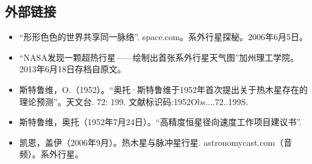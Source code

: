 \subsection{外部链接}
\begin{itemize}
\item “形形色色的世界共享同一脉络”. space.com。系外行星探秘。2006年6月5日。
\item “NASA发现一颗超热行星——绘制出首张系外行星天气图”加州理工学院。2013年6月18日存档自原文。
\item 斯特鲁维，O.（1952）。“奥托·斯特鲁维于1952年首次提出关于热木星存在的理论预测”。天文台. 72: 199. 文献标识码:1952Obs....72..199S.
\item 斯特鲁维，奥托（1952年7月24日）。“高精度恒星径向速度工作项目建议书”.
\item 凯恩，盖伊（2006年9月）。热木星与脉冲星行星. astronomycast.com（音频）。系外行星。
\end{itemize}